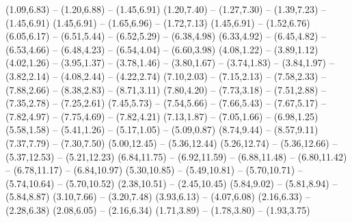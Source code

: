 \expandafter\def\csname geo:Autobahn:A73\endcsname{
  (1.09,6.83) -- (1.20,6.88) -- (1.45,6.91)
  (1.20,7.40) -- (1.27,7.30) -- (1.39,7.23) -- (1.45,6.91)
  (1.45,6.91) -- (1.65,6.96) -- (1.72,7.13)
  (1.45,6.91) -- (1.52,6.76)
  (6.05,6.17) -- (6.51,5.44) -- (6.52,5.29) -- (6.38,4.98)
  (6.33,4.92) -- (6.45,4.82) -- (6.53,4.66) -- (6.48,4.23) -- (6.54,4.04) -- (6.60,3.98)}
\expandafter\def\csname geo:Autobahn:A81\endcsname{
  (4.08,1.22) -- (3.89,1.12)
  (4.02,1.26) -- (3.95,1.37) -- (3.78,1.46) -- (3.80,1.67) -- (3.74,1.83) -- (3.84,1.97) -- (3.82,2.14) -- (4.08,2.44) -- (4.22,2.74)}
\expandafter\def\csname geo:Autobahn:A92\endcsname{
  (7.10,2.03) -- (7.15,2.13) -- (7.58,2.33) -- (7.88,2.66) -- (8.38,2.83) -- (8.71,3.11)}
\expandafter\def\csname geo:Autobahn:A93\endcsname{
  (7.80,4.20) -- (7.73,3.18) -- (7.51,2.88) -- (7.35,2.78) -- (7.25,2.61)
  (7.45,5.73) -- (7.54,5.66) -- (7.66,5.43) -- (7.67,5.17) -- (7.82,4.97) -- (7.75,4.69) -- (7.82,4.21)}
\expandafter\def\csname geo:Autobahn:A95\endcsname{
  (7.13,1.87) -- (7.05,1.66) -- (6.98,1.25)}
\expandafter\def\csname geo:Autobahn:A96\endcsname{
  (5.58,1.58) -- (5.41,1.26) -- (5.17,1.05) -- (5.09,0.87)}
\expandafter\def\csname geo:Autobahn:A115\endcsname{
  (8.74,9.44) -- (8.57,9.11)}
\expandafter\def\csname geo:Autobahn:A143\endcsname{
  (7.37,7.79) -- (7.30,7.50)}
\expandafter\def\csname geo:Autobahn:A210\endcsname{
  (5.00,12.45) -- (5.36,12.44)}
\expandafter\def\csname geo:Autobahn:A215\endcsname{
  (5.26,12.74) -- (5.36,12.66) -- (5.37,12.53) -- (5.21,12.23)}
\expandafter\def\csname geo:Autobahn:A241\endcsname{
  (6.84,11.75) -- (6.92,11.59) -- (6.88,11.48) -- (6.80,11.42) -- (6.78,11.17) -- (6.84,10.97)}
\expandafter\def\csname geo:Autobahn:A250\endcsname{
  (5.30,10.85) -- (5.49,10.81) -- (5.70,10.71) -- (5.74,10.64) -- (5.70,10.52)}
\expandafter\def\csname geo:Autobahn:A280\endcsname{
  (2.38,10.51) -- (2.45,10.45)}
\expandafter\def\csname geo:Autobahn:A392\endcsname{
  (5.84,9.02) -- (5.81,8.94) -- (5.84,8.87)}
\expandafter\def\csname geo:Autobahn:A445\endcsname{
  (3.10,7.66) -- (3.20,7.48)}
\expandafter\def\csname geo:Autobahn:A480\endcsname{
  (3.93,6.13) -- (4.07,6.08)}
\expandafter\def\csname geo:Autobahn:A560\endcsname{
  (2.16,6.33) -- (2.28,6.38)}
\expandafter\def\csname geo:Autobahn:A565\endcsname{
  (2.08,6.05) -- (2.16,6.34)}
\expandafter\def\csname geo:Autobahn:A620\endcsname{
  (1.71,3.89) -- (1.78,3.80) -- (1.93,3.75)}

